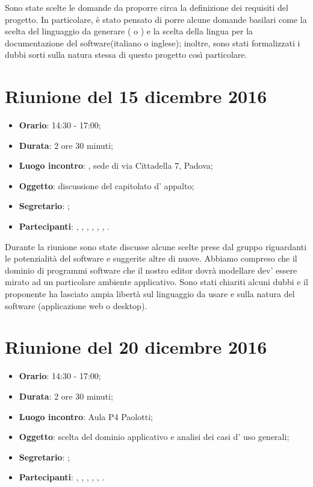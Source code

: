 Sono state scelte le domande da proporre circa la definizione dei requisiti del progetto. In particolare, è stato pensato di porre alcune domande basilari come la scelta del linguaggio da generare ( o ) e la scelta della lingua per la documentazione del software(italiano o inglese); inoltre, sono stati formalizzati i dubbi sorti sulla natura stessa di questo progetto così particolare.



\section{Riunione del 15 dicembre 2016}

\begin{itemize}
	\item \textbf{Orario}: 14:30 - 17:00;
	\item \textbf{Durata}: 2 ore 30 minuti;
	\item \textbf{Luogo incontro}: \ZU, sede di via Cittadella 7, Padova; 
	\item \textbf{Oggetto}: discussione del capitolato d' appalto;
	\item \textbf{Segretario}: \LS; 
	\item \textbf{Partecipanti}: \GP, \AZ, \GG, \LB, \LS, \MM, \PB.
\end{itemize}

Durante la riunione sono state discusse alcune scelte prese dal gruppo riguardanti le potenzialità del software e suggerite altre di nuove. Abbiamo compreso che il dominio di programmi software che il nostro editor dovrà modellare dev' essere mirato ad un particolare ambiente applicativo. Sono stati chiariti alcuni dubbi e il proponente ha lasciato ampia libertà sul linguaggio da usare e sulla natura del software (applicazione web o desktop).



\section{Riunione del 20 dicembre 2016}

\begin{itemize}
	\item \textbf{Orario}: 14:30 - 17:00;
	\item \textbf{Durata}: 2 ore 30 minuti;
	\item \textbf{Luogo incontro}: Aula P4 Paolotti; 
	\item \textbf{Oggetto}: scelta del dominio applicativo e analisi dei casi d' uso generali;
	\item \textbf{Segretario}: \PB; 
	\item \textbf{Partecipanti}: \AZ, \GG, \LB, \LS, \MM, \PB.
\end{itemize}


